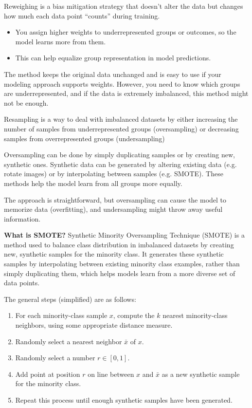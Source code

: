 \documentclass{article}
\begin{document}

Reweighing is a bias mitigation strategy that doesn’t alter the data but changes how much each data point “counts” during training.
\begin{itemize}
    \item You assign higher weights to underrepresented groups or outcomes, so the model learns more from them.
    \item This can help equalize group representation in model predictions.
\end{itemize}
The method keeps the original data unchanged and is easy to use if your modeling approach supports weights. However, you need to know which groups are underrepresented, and if the data is extremely imbalanced, this method might not be enough.

Resampling is a way to deal with imbalanced datasets by either increasing the number of samples from underrepresented groups (oversampling) or decreasing samples from overrepresented groups (undersampling)

Oversampling can be done by simply duplicating samples or by creating new, synthetic ones. Synthetic data can be generated by altering existing data (e.g. rotate images) or by interpolating between samples (e.g. SMOTE). These methods help the model learn from all groups more equally.

The approach is straightforward, but oversampling can cause the model to memorize data (overfitting), and undersampling might throw away useful information.

\textbf{What is SMOTE? } Synthetic Minority Oversampling Technique (SMOTE) is a method used to balance class distribution in imbalanced datasets by creating new, synthetic samples for the minority class. It generates these synthetic samples by interpolating between existing minority class examples, rather than simply duplicating them, which helps models learn from a more diverse set of data points.

The general steps (simplified) are as follows:
\begin{enumerate}
    \item For each minority-class sample $x$, compute the $k$ nearest minority-class neighbors, using some appropriate distance measure.
    \item Randomly select a nearest neighbor $\bar{x}$ of $x$.
    \item Randomly select a number $r \in [0,1]$.
    \item Add point at position $r$ on line between $x$ and $\bar{x}$ as a new synthetic sample for the minority class.
    \item Repeat this process until enough synthetic samples have been generated.
\end{enumerate}
\end{document}
